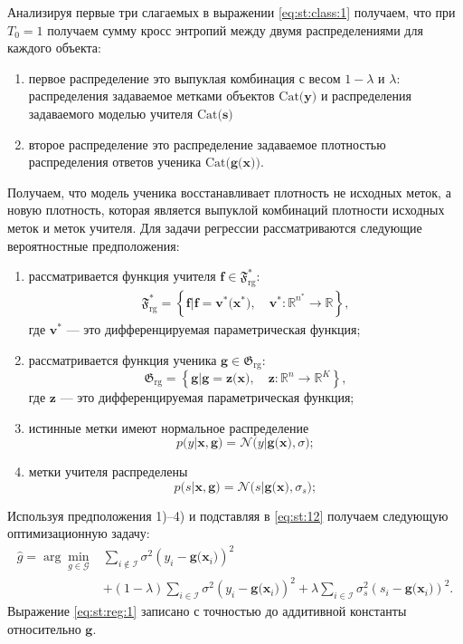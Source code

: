 Анализируя первые три слагаемых в выражении \eqref{eq:st:class:1} получаем, что при $T_0 = 1$ получаем сумму кросс энтропий между двумя распределениями для каждого объекта:
\begin{enumerate}
	\item первое распределение это выпуклая комбинация с весом $1-\lambda$ и $\lambda$: распределения задаваемое метками объектов $\text{Cat}\bigr(\mathbf{y}\bigr)$ и распределения задаваемого моделью учителя $\text{Cat}\bigr(\mathbf{s}\bigr)$
	\item второе распределение это распределение задаваемое плотностью распределения ответов ученика $\text{Cat}\bigr(\mathbf{g}\bigr(\mathbf{x}\bigr)\bigr)$.
\end{enumerate}
Получаем, что модель ученика восстанавливает плотность не исходных меток, а новую плотность, которая является выпуклой комбинаций плотности исходных меток и меток учителя.
Для задачи регрессии рассматриваются следующие вероятностные предположения:
\begin{enumerate}
	\item рассматривается функция учителя $\mathbf{f}\in\mathfrak{F}_{\text{rg}}^{*}$:
	\[
	\label{eq:F:set:priv}
	\begin{aligned}
	\mathfrak{F}_{\text{rg}}^* = \left\{\mathbf{f}| \mathbf{f} = \mathbf{v}^*\bigr(\mathbf{x}^*\bigr), \quad \mathbf{v}^*: \mathbb{R}^{n^*} \to \mathbb{R} \right\},
	\end{aligned}
	\]
	где $\mathbf{v}^*$ --- это дифференцируемая параметрическая функция;
	\item рассматривается функция ученика $\mathbf{g}\in\mathfrak{G}_{\text{rg}}$:
\[
\label{eq:G:set:rg}
\mathfrak{G}_{\text{rg}} = \left\{\mathbf{g}| \mathbf{g} = \mathbf{z}\bigr(\mathbf{x}\bigr), \quad \mathbf{z}: \mathbb{R}^n \to \mathbb{R}^K \right\},
\]
где $\mathbf{z}$ --- это дифференцируемая параметрическая функция;
	\item истинные метки имеют нормальное распределение
	\[
		p\bigr(y|\mathbf{x}, \mathbf{g}\bigr) = \mathcal{N}\bigr(y|\mathbf{g}\bigr(\mathbf{x}\bigr), \sigma\bigr);
	\]
	\item метки учителя распределены
	\[
		p\bigr(s| \mathbf{x}, \mathbf{g}\bigr) = \mathcal{N}\bigr(s|\mathbf{g}\bigr(\mathbf{x}\bigr), \sigma_s\bigr);
	\]
\end{enumerate}

Используя предположения 1)--4) и подставляя в \eqref{eq:st:12} получаем следующую оптимизационную задачу:
\[
\label{eq:st:reg:1}
\begin{aligned}
\hat{g} = \arg\min_{g\in \mathcal{G}} & \sum_{i\not\in \mathcal{I}}\sigma^2\left(y_i-\mathbf{g}\bigr(\mathbf{x}_i\bigr)\right)^2 \\
&+ \left(1-\lambda\right)\sum_{i\in \mathcal{I}}\sigma^2\left(y_i-\mathbf{g}\bigr(\mathbf{x}_i\bigr)\right)^2 + \lambda\sum_{i\in \mathcal{I}}\sigma_s^2\left(s_i-\mathbf{g}\bigr(\mathbf{x}_i\bigr)\right)^2.
\end{aligned}
\]
Выражение \eqref{eq:st:reg:1} записано с точностью до аддитивной константы относительно $\mathbf{g}$. 

